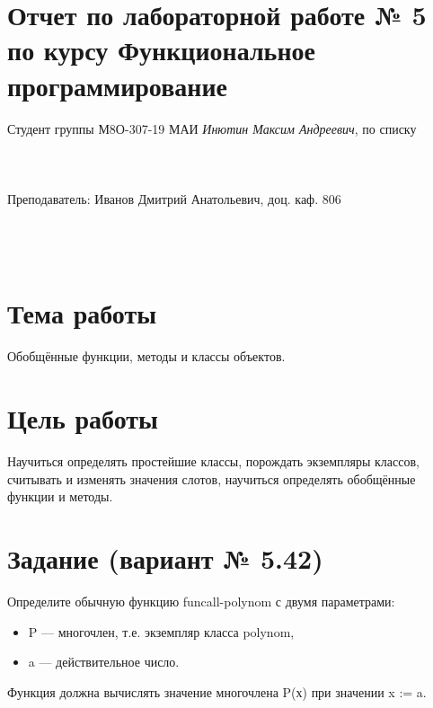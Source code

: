 \documentclass[12pt]{article}
\begin{document}
\section*{Отчет по лабораторной работе № 5 \\
по курсу \guillemotleft Функциональное программирование\guillemotright}
\begin{flushright}
Студент группы М8О-307-19 МАИ \textit{Инютин Максим Андреевич},  по списку \\
 \\
 \\
\ \\
Преподаватель: Иванов Дмитрий Анатольевич, доц. каф. 806 \\
 \\
 \\
 \\

\end{flushright}

\section{Тема работы}
Обобщённые функции, методы и классы объектов.

\section{Цель работы}
Научиться определять простейшие классы, порождать экземпляры классов, считывать и изменять значения слотов, научиться определять обобщённые функции и методы.

\section{Задание (вариант № 5.42)}
Определите обычную функцию funcall-polynom с двумя параметрами:

\begin{itemize}
    \item P --- многочлен, т.е. экземпляр класса polynom,
    \item a --- действительное число.
\end{itemize}

Функция должна вычислять значение многочлена P(х) при значении x := a.
\end{document}
